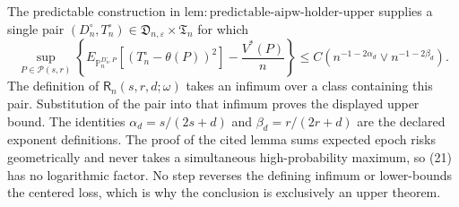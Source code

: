 The predictable construction in \(\mathrm{lem{:}predictable\text{-}aipw\text{-}holder\text{-}upper}\) supplies a single pair \((D_n^{\circ},T_n^{\circ})\in\mathfrak D_{n,\varepsilon}\times\mathfrak T_n\) for which
\[
\sup_{P\in\mathcal P(s,r)}
\left\{
E_{\mathbb P_n^{D_n^{\circ},P}}[(T_n^{\circ}-\theta(P))^2]
-\frac{V^*(P)}n
\right\}
\leq C\left(n^{-1-2\alpha_d}\vee n^{-1-2\beta_d}\right).
\tag{21}
\]
The definition of \(\mathsf R_n(s,r,d;\omega)\) takes an infimum over a class containing this pair.  Substitution of the pair into that infimum proves the displayed upper bound.  The identities \(\alpha_d=s/(2s+d)\) and \(\beta_d=r/(2r+d)\) are the declared exponent definitions.  The proof of the cited lemma sums expected epoch risks geometrically and never takes a simultaneous high-probability maximum, so (21) has no logarithmic factor.  No step reverses the defining infimum or lower-bounds the centered loss, which is why the conclusion is exclusively an upper theorem.
